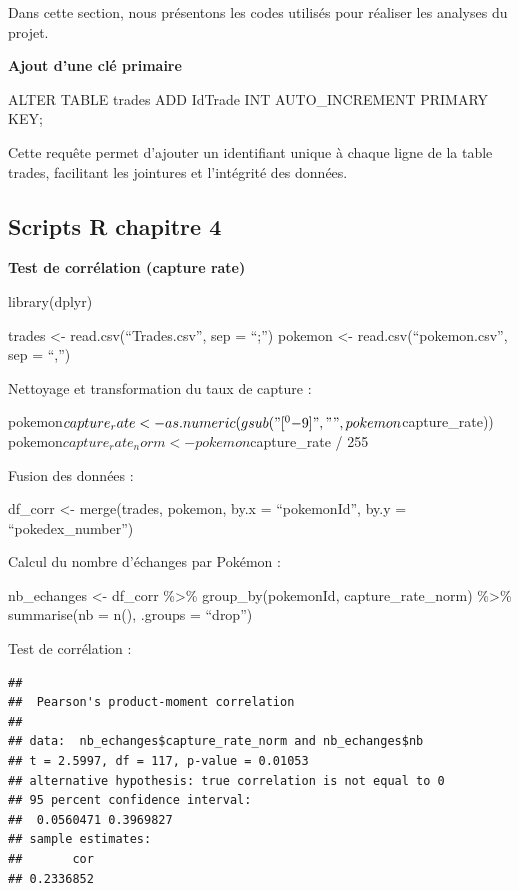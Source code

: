 \documentclass[mstat,12pt]{unswthesis}
\newenvironment{Shaded}{\begin{snugshade}}{\end{snugshade}}
\newcommand{\FunctionTok}[1]{\textcolor[rgb]{0.13,0.29,0.53}{\textbf{#1}}}
\newcommand{\NormalTok}[1]{#1}
\newcommand{\SpecialCharTok}[1]{\textcolor[rgb]{0.81,0.36,0.00}{\textbf{#1}}}
\begin{document}
Dans cette section, nous présentons les codes utilisés pour réaliser les
analyses du projet.

\textbf{Ajout d'une clé primaire}

ALTER TABLE trades ADD IdTrade INT AUTO\_INCREMENT PRIMARY KEY;

Cette requête permet d'ajouter un identifiant unique à chaque ligne de
la table trades, facilitant les jointures et l'intégrité des données.

\subsection{Scripts R chapitre 4}\label{scripts-r-chapitre-4}

\textbf{Test de corrélation (capture rate)}

library(dplyr)

trades \textless- read.csv(``Trades.csv'', sep = ``;'') pokemon
\textless- read.csv(``pokemon.csv'', sep = ``,'')

Nettoyage et transformation du taux de capture :

pokemon\(capture_rate <- as.numeric(gsub("[^0-9]", "", pokemon\)capture\_rate))
pokemon\(capture_rate_norm <- pokemon\)capture\_rate / 255

Fusion des données :

df\_corr \textless- merge(trades, pokemon, by.x = ``pokemonId'', by.y =
``pokedex\_number'')

Calcul du nombre d'échanges par Pokémon :

nb\_echanges \textless- df\_corr \%\textgreater\% group\_by(pokemonId,
capture\_rate\_norm) \%\textgreater\% summarise(nb = n(), .groups =
``drop'')

Test de corrélation :

\begin{Shaded}
\end{Shaded}

\begin{verbatim}
## 
##  Pearson's product-moment correlation
## 
## data:  nb_echanges$capture_rate_norm and nb_echanges$nb
## t = 2.5997, df = 117, p-value = 0.01053
## alternative hypothesis: true correlation is not equal to 0
## 95 percent confidence interval:
##  0.0560471 0.3969827
## sample estimates:
##       cor 
## 0.2336852
\end{verbatim}
\end{document}
